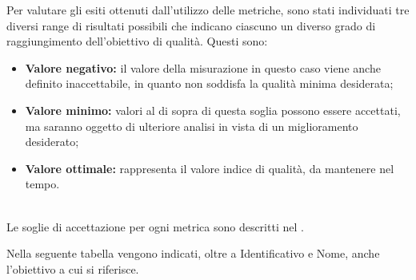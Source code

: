 		Per valutare gli esiti ottenuti dall'utilizzo delle metriche, sono stati individuati tre
		diversi range di risultati possibili che indicano ciascuno un diverso grado di raggiungimento 
		dell'obiettivo di qualità. Questi sono:

		\begin{itemize}
			\item \textbf{Valore negativo:} il valore della misurazione in questo caso viene anche 
			definito inaccettabile, in quanto non soddisfa la qualità minima desiderata;
			\item \textbf{Valore minimo:} valori al di sopra di questa soglia possono essere accettati, 
			ma saranno oggetto di ulteriore analisi in vista di un miglioramento desiderato;
			\item \textbf{Valore ottimale:} rappresenta il valore indice di qualità, da mantenere nel tempo.
		\end{itemize}\\
		
		Le soglie di accettazione per ogni metrica sono descritti nel \vPianoDiQualifica{}.\\		
		

		
			Nella seguente tabella vengono indicati, oltre a Identificativo e Nome, anche 
			l'obiettivo a cui si riferisce.\\

